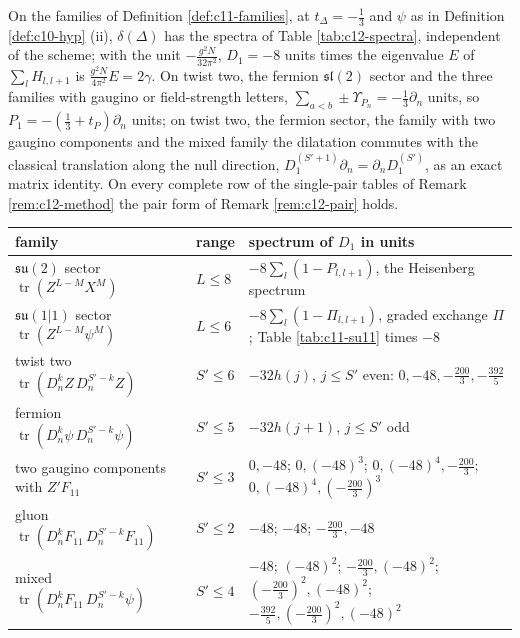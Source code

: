 \begin{proposition}
\label{prop:c12-spectra}
On the families of Definition \ref{def:c11-families}, at $t_\Delta=-\tfrac13$ and $\psi$ as in Definition \ref{def:c10-hyp} (ii), $\delta(\Delta)$ has the spectra of Table \ref{tab:c12-spectra}, independent of the scheme; with the unit $-\tfrac{g^2N}{32\pi^2}$, $D_1=-8$ units times the eigenvalue $E$ of $\sum_lH_{l,l+1}$ is $\tfrac{g^2N}{4\pi^2}E=2\gamma$. On twist two, the fermion $\mathfrak{sl}(2)$ sector and the three families with gaugino or field-strength letters, $\sum_{a<b}\pm\Upsilon_{P_n}=-\tfrac13\partial_n$ units, so $P_1=-(\tfrac13+t_P)\partial_n$ units; on twist two, the fermion sector, the family with two gaugino components and the mixed family the dilatation commutes with the classical translation along the null direction, $D_1^{(S'+1)}\partial_n=\partial_nD_1^{(S')}$, as an exact matrix identity. On every complete row of the single-pair tables of Remark \ref{rem:c12-method} the pair form of Remark \ref{rem:c12-pair} holds.
\end{proposition}

\begin{tabular}{l|l|l}
family & range & spectrum of $D_1$ in units\\
\hline
$\mathfrak{su}(2)$ sector $\operatorname{tr}(Z^{L-M}X^M)$ & $L\le8$ & $-8\sum_l(1-P_{l,l+1})$, the Heisenberg spectrum\\
$\mathfrak{su}(1|1)$ sector $\operatorname{tr}(Z^{L-M}\psi^M)$ & $L\le6$ & $-8\sum_l(1-\Pi_{l,l+1})$, graded exchange $\Pi$; Table \ref{tab:c11-su11} times $-8$\\
twist two $\operatorname{tr}(D_n^kZ\,D_n^{S'-k}Z)$ & $S'\le6$ & $-32h(j)$, $j\le S'$ even: $0,-48,-\tfrac{200}3,-\tfrac{392}5$\\
fermion $\operatorname{tr}(D_n^k\psi\,D_n^{S'-k}\psi)$ & $S'\le5$ & $-32h(j+1)$, $j\le S'$ odd\\
two gaugino components with $Z'F_{11}$ & $S'\le3$ & $0,-48$; $0,(-48)^3$; $0,(-48)^4,-\tfrac{200}3$; $0,(-48)^4,(-\tfrac{200}3)^3$\\
gluon $\operatorname{tr}(D_n^kF_{11}\,D_n^{S'-k}F_{11})$ & $S'\le2$ & $-48$; $-48$; $-\tfrac{200}3,-48$\\
mixed $\operatorname{tr}(D_n^kF_{11}\,D_n^{S'-k}\psi)$ & $S'\le4$ & $-48$; $(-48)^2$; $-\tfrac{200}3,(-48)^2$; $(-\tfrac{200}3)^2,(-48)^2$; $-\tfrac{392}5,(-\tfrac{200}3)^2,(-48)^2$\\
\end{tabular}

